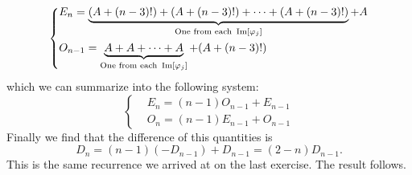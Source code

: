 \documentclass[12pt]{memoir}
\DeclareMathOperator{\Im}{\text{Im}}
\begin{document}
\begin{ptcbr}
    $$
    \left\lbrace
    \begin{aligned}
        &E_{n}=\underbrace{(A+(n-3)!)+(A+(n-3)!)+\dots+(A+(n-3)!)}_{\text{One from each }\Im[\vf_j]}+A\\
        &O_{n-1}=\underbrace{A+A+\dots+A}_{\text{One from each }\Im[\vf_j]}+(A+(n-3)!)
    \end{aligned}
    \right.
    $$ 
    which we can summarize into the following system:
    $$
    \left\lbrace
    \begin{aligned}
        &E_{n}=(n-1)O_{n-1}+E_{n-1}\\
    &O_n=(n-1)E_{n-1}+O_{n-1}
    \end{aligned}
    \right.
    $$
    Finally we find that the difference of this quantities is 
    $$D_n=(n-1)(-D_{n-1})+D_{n-1}=(2-n)D_{n-1}.$$
    This is the same recurrence we arrived at on the last exercise. The result follows.
\end{ptcbr}
\end{document}
